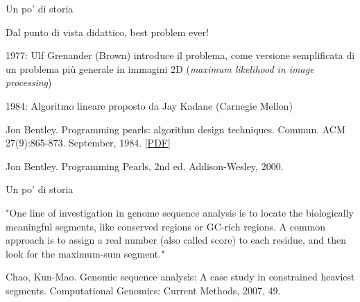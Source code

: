 \begin{frame}{Un po' di storia}

\vspace{-9pt}
\begin{myboxtitle}
\BIL
\item Dal punto di vista didattico, \alert{best problem ever}!
\item 1977: Ulf Grenander (Brown) introduce il problema, come versione semplificata di un problema più generale in immagini 2D (\emph{maximum likelihood in image processing})
\item 1984: Algoritmo lineare proposto da Jay Kadane (Carnegie Mellon)
\EIL
\end{myboxtitle}

\bigskip\small
Jon Bentley. \alert{Programming pearls: algorithm design techniques}. Commun. ACM 27(9):865-873. September, 1984. [\href{http://cricca.disi.unitn.it/montresor/wp-content/uploads/2018/09/programmingpearls.pdf}{PDF}]


\bigskip\small
Jon Bentley. \alert{Programming Pearls, 2nd ed.} Addison-Wesley, 2000.

\end{frame}


\begin{frame}{Un po' di storia}

\vspace{-9pt}
\begin{myboxtitle}
"One line of investigation in genome sequence analysis is to locate the biologically meaningful segments, like conserved regions or GC-rich regions. 
A common approach is to assign a real number (also called score) to each residue, and then look for the maximum-sum segment."
\end{myboxtitle}

\bigskip\small
Chao, Kun-Mao. \alert{Genomic sequence analysis: A case study in constrained heaviest segments}. Computational Genomics: Current Methods, 2007, 49.
\end{frame}


